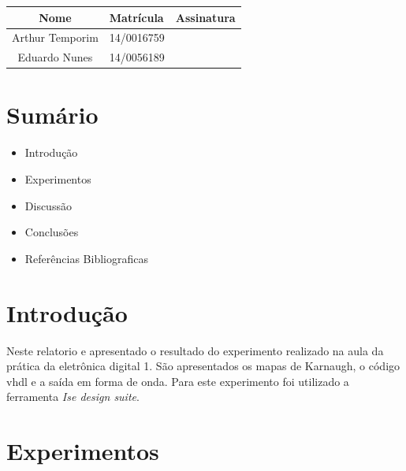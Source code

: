 \documentclass[12pts]{article}
\date{Setembro 23, 2016}
\begin{document}
\maketitle	
\begin{center}

\begin{tabular}{|c|l|r|}
\hline
Nome & Matrícula & Assinatura\\
\hline

Arthur Temporim & 14/0016759 & \\
\hline	
Eduardo Nunes & 14/0056189 & \\

\hline	
\end{tabular}

\end{center}


\newpage

\section{Sumário}

\begin{itemize}
	\item Introdução
	\singlespacing
	\item Experimentos
	\singlespacing
	\item Discussão
	\singlespacing
	\item Conclusões 
	\singlespacing
	\item Referências Bibliograficas
	\singlespacing
\end{itemize}

\newpage


\section{Introdução}

	 Neste relatorio e apresentado o resultado do experimento realizado na aula da prática da eletrônica digital 1. São apresentados os mapas de Karnaugh, o código vhdl e a saída em forma de onda. Para este experimento foi utilizado a ferramenta \textit{Ise design suite}.

\section{Experimentos}

\end{document}
